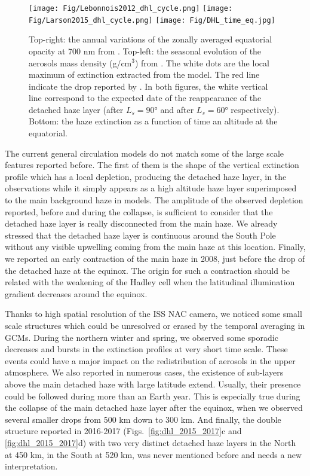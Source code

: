 \begin{figure}[!ht]
    \centering
    \texttt{[image: Fig/Lebonnois2012\_dhl\_cycle.png]}
    \texttt{[image: Fig/Larson2015\_dhl\_cycle.png]}
    \texttt{[image: Fig/DHL\_time\_eq.jpg]}
    \caption{Top-right: the annual variations of the zonally averaged equatorial opacity at 700 nm from
        \cite{Lebonnois2012}.
        Top-left: the seasonal evolution of the aerosols mass density (g/cm$^3$) from \cite{Larson2015}.
        The white dots are the local maximum of extinction extracted from the model. The red line indicate
        the drop reported by \cite{West2011}.
        In both figures, the white vertical line correspond to the expected date of the reappearance of the
        detached haze layer (after $L_s = \ang{90}$ and after $L_s = \ang{60}$ respectively).
        Bottom: the haze extinction as a function of time an altitude at the equatorial.
    }
    \label{fig:gcm_cycle}
\end{figure}

The current general circulation models do not match some of the large scale features reported before. The first of them
is the shape of the vertical extinction profile which has a local depletion, producing the detached haze layer, in the
observations while it simply appears as a high altitude haze layer superimposed to the main background haze in models.
The amplitude of the observed depletion reported, before and during the collapse, is sufficient to consider that the
detached haze layer is really disconnected from the main haze. We already stressed that the detached haze layer is
continuous around the South Pole without any visible upwelling coming from the main haze at this location. Finally, we
reported an early contraction of the main haze in 2008, just before the drop of the detached haze at the equinox. The origin
for such a contraction should be related with the weakening of the Hadley cell when the latitudinal illumination gradient
decreases around the equinox.

Thanks to high spatial resolution of the ISS NAC camera, we noticed some small scale structures which could be unresolved or
erased by the temporal averaging in GCMs. During the northern winter and spring, we observed some sporadic decreases and
bursts in the extinction profiles at very short time scale. These events could have a major impact on the redistribution of
aerosols in the upper atmosphere. We also reported in numerous cases, the existence of sub-layers above the main detached
haze with large latitude extend. Usually, their presence could be followed during more than an Earth year. This is
especially true during the collapse of the main detached haze layer after the equinox, when we observed several smaller
drops from 500 km down to 300 km. And finally, the double structure reported in 2016-2017
(Figs.~\ref{fig:dhl_2015_2017}c and \ref{fig:dhl_2015_2017}d) with two very distinct detached haze layers in the
North at 450 km, in the South at 520 km, was never mentioned before and needs a new interpretation.
